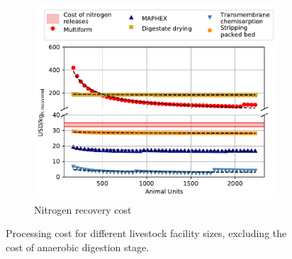 \begin{refsection}[referencesApD]
\begin{figure}[h!]
	\begin{subfigure}[t]{0.7\textwidth}
		\centering
		\includegraphics[width=1\linewidth, trim={0cm 0cm 0cm 0cm},clip]{gfx/AppendixD/ScaleUp2_NoAD.pdf} 
		\caption{Nitrogen recovery cost}
		\label{fig:ScaleUp2_NoAD}
	\end{subfigure}
	
	\caption{Processing cost for different livestock facility sizes, excluding the cost of anaerobic digestion stage.} \label{fig:ScaleUGlobal_NoAD}
\end{figure}

\newpage


\end{refsection}
